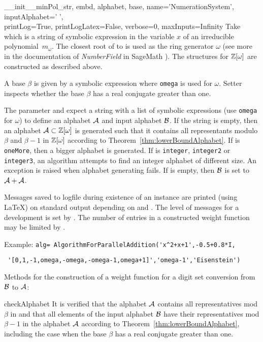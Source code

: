 \begin{method}{\_\_init\_\_}{minPol\_str, embd, alphabet, base, name='NumerationSystem', inputAlphabet=' ',\\
 printLog=True, printLogLatex=False, verbose=0, maxInputs=Infinity}
Take  which is a string of symbolic expression in the variable $x$ of an irreducible polynomial~$m_\omega$. The closest root of   to  is used as the ring generator $\omega$ (see more in the documentation of \emph{NumberField} in SageMath \cite{sage}). The structures for $\mathbb{Z}[\omega]$ are constructed as described above. 

A base $\beta$ is given by a symbolic expression  where \verb+omega+ is used for $\omega$.
Setter  inspects whether the base $\beta$ has a real conjugate greater than one.

The parameter  and  expect a string with a list of symbolic expressions (use \verb+omega+ for $\omega$) to define an alphabet $\mathcal{A}$ and input alphabet $\mathcal{B}$. If the string  is empty, then an alphabet $\mathcal{A}\subset\mathbb{Z}[\omega]$ is generated such that it contains all representants modulo $\beta$ and $\beta-1$ in $\mathbb{Z}[\omega]$ according to Theorem~\ref{thm:lowerBoundAlphabet}. If  is \verb+oneMore+, then a bigger alphabet is generated.  If  is \verb+integer+, \verb+integer2+ or \verb+integer3+, an algorithm attempts to find an integer alphabet of different size. An exception is raised when alphabet generating fails. If   is empty, then $\mathcal{B}$ is set to $\mathcal{A}+\mathcal{A}$.

Messages saved to logfile during existence of an instance are printed (using \LaTeX) on standard output depending on  and . The level of messages for a development is set by . The number of entries in a constructed weight function may be limited by .

Example:
\verb|alg= AlgorithmForParallelAddition('x^2+x+1',-0.5+0.8*I,|

\verb| '[0,1,-1,omega,-omega,-omega-1,omega+1]','omega-1','Eisenstein')|
\end{method}

Methods for the construction of a weight function for a digit set conversion from $\mathcal{B}$ to $\mathcal{A}$:
\begin{method}{checkAlphabet}{}
It is verified that the alphabet $\mathcal{A}$ contains all representatives mod $\beta$ in  and that all elements of the input alphabet $\mathcal{B}$ have their representatives mod $\beta-1$ in the alphabet $\mathcal{A}$ according to Theorem~\ref{thm:lowerBoundAlphabet}, including the case when the base $\beta$ has a real conjugate greater than one.
\end{method}


